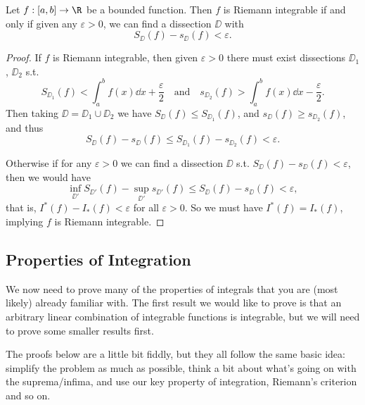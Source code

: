 \begin{theorem}
	Let $f:[a, b] \rightarrow \R$ be a bounded function. Then $f$ is Riemann integrable if and only if given any $\varepsilon>0$, we can find a dissection $\DD$ with
	$$
	S_\DD(f) - s_\DD(f) < \varepsilon.
	$$
\end{theorem}
\begin{proof}
	If $f$ is Riemann integrable, then given $\varepsilon > 0$ there must exist dissections $\DD_1$, $\DD_2$ s.t.
	$$
	S_{\DD_1}(f) < \int_a^b f(x) \dd x + \frac{\varepsilon}{2} \quad \text{and} \quad s_{\DD_2}(f) > \int_a^b f(x) \dd x - \frac{\varepsilon}{2}.
	$$
	Then taking $\DD = \DD_1 \cup \DD_2$ we have $S_{\DD}(f) \leq S_{\DD_1}(f)$, and $s_{\DD}(f) \geq s_{\DD_2}(f)$, and thus
	$$
	S_\DD(f) - s_\DD(f) \leq S_{\DD_1}(f) - s_{\DD_2}(f) < \varepsilon.
	$$

	Otherwise if for any $\varepsilon > 0$ we can find a dissection $\DD$ s.t. $S_{\DD}(f) - s_{\DD}(f) < \varepsilon$, then we would have
	$$
	\inf_{\DD'} S_{\DD'}(f) - \sup_{\DD'} s_{\DD'}(f) \leq S_{\DD}(f) - s_{\DD}(f) < \varepsilon,
	$$
	that is, $I^*(f) - I_*(f) < \varepsilon$ for all $\varepsilon > 0$. So we must have $I^*(f) = I_*(f)$, implying $f$ is Riemann integrable.
\end{proof}


\subsection{Properties of Integration}

We now need to prove many of the properties of integrals that you are (most likely) already familiar with. The first result we would like to prove is that an arbitrary linear combination of integrable functions is integrable, but we will need to prove some smaller results first.

The proofs below are a little bit fiddly, but they all follow the same basic idea: simplify the problem as much as possible, think a bit about what's going on with the suprema/infima, and use our key property of integration, Riemann's criterion and so on. 

